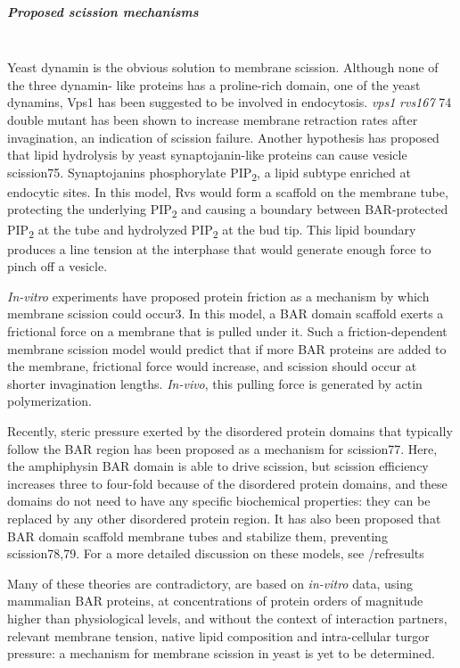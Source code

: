 			\subparagraph{Proposed scission mechanisms}
			\mbox{}\\
			Yeast dynamin is the obvious solution to membrane scission. Although none of the three dynamin- like proteins has a proline-rich domain, one of the yeast dynamins, Vps1 has been suggested to be involved in endocytosis. \textit{vps1\textDelta} \textit{rvs167\textDelta} 74 double mutant has been shown to increase membrane retraction rates after invagination, an indication of scission failure. Another hypothesis has proposed that lipid hydrolysis by yeast synaptojanin-like proteins can cause vesicle scission75. Synaptojanins phosphorylate PIP\textsubscript{2}, a lipid subtype enriched at endocytic sites. In this model, Rvs would form a scaffold on the membrane tube, protecting the underlying PIP\textsubscript{2} and causing a boundary between BAR-protected PIP\textsubscript{2} at the tube and hydrolyzed PIP\textsubscript{2} at the bud tip. This lipid boundary produces a line tension at the interphase that would generate enough force to pinch off a vesicle. 
			
			\vspace{5mm}
			\textit{In-vitro} experiments have proposed protein friction as a mechanism by which membrane scission could occur3. In this model, a BAR domain scaffold exerts a frictional force on a membrane that is pulled under it. Such a friction-dependent membrane scission model would predict that if more BAR proteins are added to the membrane, frictional force would increase, and scission should occur at shorter invagination lengths. \textit{In-vivo}, this pulling force is generated by actin polymerization. 

			\vspace{5mm}
			Recently, steric pressure exerted by the disordered protein domains that typically follow the BAR region has been proposed as a mechanism for scission77. Here, the amphiphysin BAR domain is able to drive scission, but scission efficiency increases three to four-fold because of the disordered protein domains, and these domains do not need to have any specific biochemical properties: they can be replaced by any other disordered protein region. It has also been proposed that BAR domain scaffold membrane tubes and stabilize them, preventing scission78,79. For a more detailed discussion on these models, see /ref{results}

			\vspace{5mm}
			Many of these theories are contradictory, are based on \textit{in-vitro} data, using mammalian BAR proteins, at concentrations of protein orders of magnitude higher than physiological levels, and without the context of interaction partners, relevant membrane tension, native lipid composition and intra-cellular turgor pressure: a mechanism for membrane scission in yeast is yet to be determined. 


